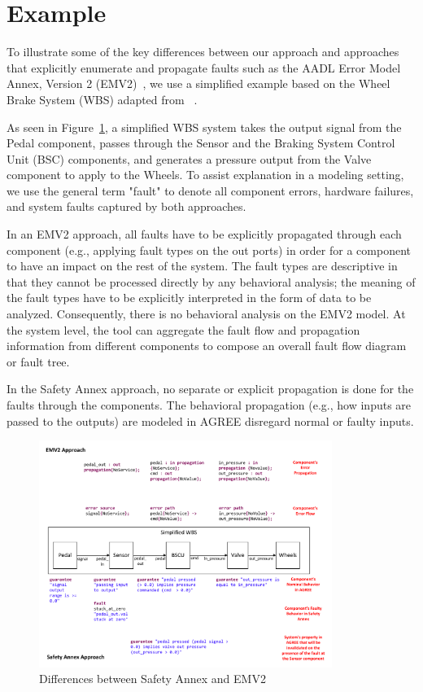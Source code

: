 \section{Example}
\label{sec:comparison_with_EMV2}

To illustrate some of the key differences between our approach and approaches that explicitly enumerate and propagate faults such as the AADL Error Model Annex, Version 2 (EMV2)~\cite{EMV2}, we use a simplified example based on the Wheel Brake System (WBS) adapted from ~\cite{WBS_EMV2_Example}.

As seen in Figure~\ref{fig:comparison_with_EMV2}, a simplified WBS system takes the output signal from the Pedal component, passes through the Sensor and the Braking System Control Unit (BSC) components, and generates a pressure output from the Valve component to apply to the Wheels. To assist explanation in a modeling setting, we use the general term "fault" to denote all component errors, hardware failures, and system faults captured by both approaches.

In an EMV2 approach, all faults have to be explicitly propagated through each component (e.g., applying fault types on the out ports) in order for a component to have an impact on the rest of the system. The fault types are descriptive in that they cannot be processed directly by any behavioral analysis; the meaning of the fault types have to be explicitly interpreted in the form of data to be analyzed. Consequently, there is no behavioral analysis on the EMV2 model. At the system level, the tool can aggregate the fault flow and propagation information from different components to compose an overall fault flow diagram or fault tree.

In the Safety Annex approach, no separate or explicit propagation is done for the faults through the components. The behavioral propagation (e.g., how inputs are passed to the outputs) are modeled in AGREE disregard normal or faulty inputs.

\begin{figure}[h!]
	\vspace{-0.19in}
	\centering
	\includegraphics[trim=0 9 0 5,clip,width=0.85\textwidth]{images/Visio-Comparison_with_EMV2.pdf}
	\caption{Differences between Safety Annex and EMV2}
	\label{fig:comparison_with_EMV2}
\end{figure}

 


